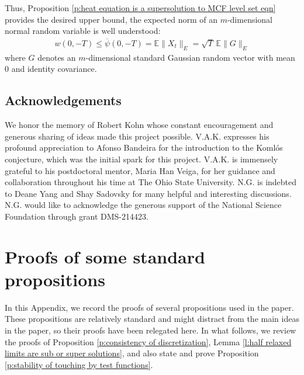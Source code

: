 \documentclass[reqno]{amsart}
\numberwithin{equation}{section}
\begin{document}
Thus, Proposition \ref{p:heat equation is a supersolution to MCF level set eqn} provides the desired upper bound, 
the expected norm of an $m$-dimensional normal random variable is well understood: 
\begin{align*}
w(0,-T) \leq  \overline{\psi}(0, -T) =  \mathbb{E}\|X_t\|_E  = \sqrt {T}\, \mathbb{E}\|G\|_E
\end{align*} where $G$ denotes an $m$-dimensional standard Gaussian random vector with mean $0$ and identity covariance.





\subsection*{Acknowledgements} We honor the memory of Robert Kohn whose constant encouragement and generous sharing of ideas made this project possible.  V.A.K.  expresses his profound appreciation to Afonso Bandeira for the introduction to the Koml\'os conjecture, which was the initial spark for this project. V.A.K. is immensely grateful to his postdoctoral mentor, Maria Han Veiga, for her guidance and collaboration throughout his time at The Ohio State University. N.G. is indebted to Deane Yang and Shay Sadovsky for many helpful and interesting discussions. N.G. would like to acknowledge the generous support of the National Science Foundation through grant DMS-214423.






\appendix

\section{Proofs of some standard propositions}\label{a:proof of some standard proposition}

In this Appendix, we record the proofs of several propositions used in the paper. These propositions are relatively standard and might distract from the main ideas in the paper, so their proofs have been relegated here. In what follows, we review the proofs of Proposition \ref{p:consistency of discretization}, Lemma \ref{l:half relaxed limits are sub or super solutions}, and also state and prove Proposition \ref{p:stability of touching by test functions}. 
\end{document}
